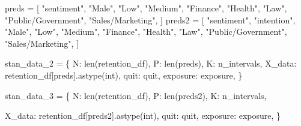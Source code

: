 \documentclass[
  letterpaper,
  DIV=11,
  numbers=noendperiod]{scrartcl}
\newenvironment{Shaded}{\begin{snugshade}}{\end{snugshade}}
\newcommand{\BuiltInTok}[1]{\textcolor[rgb]{0.00,0.23,0.31}{#1}}
\newcommand{\NormalTok}[1]{\textcolor[rgb]{0.00,0.23,0.31}{#1}}
\newcommand{\OperatorTok}[1]{\textcolor[rgb]{0.37,0.37,0.37}{#1}}
\newcommand{\StringTok}[1]{\textcolor[rgb]{0.13,0.47,0.30}{#1}}
\begin{document}
\begin{Shaded}
\begin{Highlighting}[]
\NormalTok{preds }\OperatorTok{=}\NormalTok{ [}
    \StringTok{"sentiment"}\NormalTok{,}
    \StringTok{"Male"}\NormalTok{,}
    \StringTok{"Low"}\NormalTok{,}
    \StringTok{"Medium"}\NormalTok{,}
    \StringTok{"Finance"}\NormalTok{,}
    \StringTok{"Health"}\NormalTok{,}
    \StringTok{"Law"}\NormalTok{,}
    \StringTok{"Public/Government"}\NormalTok{,}
    \StringTok{"Sales/Marketing"}\NormalTok{,}
\NormalTok{]}
\NormalTok{preds2 }\OperatorTok{=}\NormalTok{ [}
    \StringTok{"sentiment"}\NormalTok{,}
    \StringTok{"intention"}\NormalTok{,}
    \StringTok{"Male"}\NormalTok{,}
    \StringTok{"Low"}\NormalTok{,}
    \StringTok{"Medium"}\NormalTok{,}
    \StringTok{"Finance"}\NormalTok{,}
    \StringTok{"Health"}\NormalTok{,}
    \StringTok{"Law"}\NormalTok{,}
    \StringTok{"Public/Government"}\NormalTok{,}
    \StringTok{"Sales/Marketing"}\NormalTok{,}
\NormalTok{]}


\NormalTok{stan\_data\_2 }\OperatorTok{=}\NormalTok{ \{}
  \StringTok{\textquotesingle{}N\textquotesingle{}}\NormalTok{: }\BuiltInTok{len}\NormalTok{(retention\_df),}
  \StringTok{\textquotesingle{}P\textquotesingle{}}\NormalTok{: }\BuiltInTok{len}\NormalTok{(preds),}
  \StringTok{\textquotesingle{}K\textquotesingle{}}\NormalTok{: n\_intervals,}
  \StringTok{\textquotesingle{}X\_data\textquotesingle{}}\NormalTok{: retention\_df[preds].astype(}\BuiltInTok{int}\NormalTok{),}
  \StringTok{\textquotesingle{}quit\textquotesingle{}}\NormalTok{: quit,}
  \StringTok{\textquotesingle{}exposure\textquotesingle{}}\NormalTok{: exposure,}
\NormalTok{\}}

\NormalTok{stan\_data\_3 }\OperatorTok{=}\NormalTok{ \{}
  \StringTok{\textquotesingle{}N\textquotesingle{}}\NormalTok{: }\BuiltInTok{len}\NormalTok{(retention\_df),}
  \StringTok{\textquotesingle{}P\textquotesingle{}}\NormalTok{: }\BuiltInTok{len}\NormalTok{(preds2),}
  \StringTok{\textquotesingle{}K\textquotesingle{}}\NormalTok{: n\_intervals,}

  \StringTok{\textquotesingle{}X\_data\textquotesingle{}}\NormalTok{: retention\_df[preds2].astype(}\BuiltInTok{int}\NormalTok{),}
  \StringTok{\textquotesingle{}quit\textquotesingle{}}\NormalTok{: quit,}
  \StringTok{\textquotesingle{}exposure\textquotesingle{}}\NormalTok{: exposure,}
\NormalTok{\}}


\end{Highlighting}
\end{Shaded}
\end{document}
